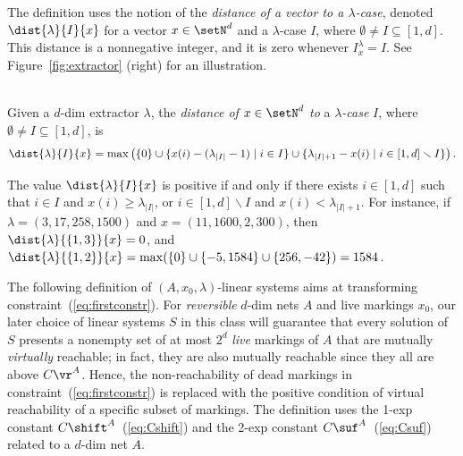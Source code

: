 The definition uses the notion of the \emph{distance of a vector to a
$\lambda$-case}, denoted $\dist{\lambda}{I}{x}$ for a vector
$x\in\setN^d$ and a $\lambda$-case $I$, where
$\emptyset\neq I\subseteq[1,d]$.
This distance is a nonnegative integer, and it is zero whenever
$I^\lambda_x=I$.
See Figure~\ref{fig:extractor} (right) for an illustration.


\begin{defi}
\hfill\\
Given a $d$-dim extractor $\lambda$, the \emph{distance of}
	$x\in\setN^d$ \emph{to} a \emph{$\lambda$-case} $I$, where
	$\emptyset\neq I\subseteq
[1,d]$, is 
	\[\dist{\lambda}{I}{x}=\max\left(\{0\}\cup
	\{x(i)-(\lambda_{|I|}-1)\mid i\in
I\}\cup\{\lambda_{|I|+1}-x(i)\mid i\in[1,d]\smallsetminus I\}\right).\]
\end{defi}	

\noindent
The value $\dist{\lambda}{I}{x}$ is positive if
and only if there exists
$i\in [1,d]$ such that $i\in I$ and $x(i)\geq \lambda_{|I|}$, or
$i\in[1,d]\smallsetminus I$ and $x(i)<\lambda_{|I|+1}$.
For instance, if $\lambda=(3,17,258,1500)$ and $x=(11,1600,2,300)$,
then $\dist{\lambda}{\{1,3\}}{x}=0$, 
and
$\dist{\lambda}{\{1,2\}}{x}=\max(\{0\}\cup\{-5,1584\}\cup\{256,-42\})=1584$. 

\smallskip

The following definition of $(A,x_0,\lambda)$-linear systems aims at
transforming
 constraint~(\ref{eq:firstconstr}). 
For  \emph{reversible} $d$-dim nets $A$ and live 
markings $x_0$, 
our later choice of linear systems $S$
in this class will guarantee that 
every solution of $S$ presents
a nonempty set of at most $2^d$ \emph{live} markings of $A$ that are mutually \emph{virtually} reachable; in
fact, they are also mutually reachable since they all are above $C\vr^A$.
Hence, the non-reachability of dead markings in 
constraint~(\ref{eq:firstconstr}) is replaced with the positive
condition of virtual reachability of a specific subset of markings. 
The definition uses the 1-exp constant $C\shift^A$~(\ref{eq:Cshift}) and the 2-exp
constant $C\suf^A$~(\ref{eq:Csuf}) 
related to a $d$-dim
net $A$.

